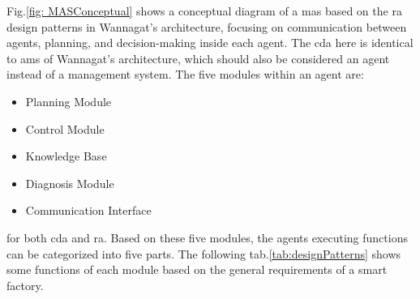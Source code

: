 
Fig.\ref{fig: MASConceptual} shows a conceptual diagram of a \gls{mas} based 
on the \gls{ra} design patterns 
in Wannagat’s architecture\cite{cruz_salazar_cyber-physical_2019}, 
focusing on communication between agents, 
planning, and decision-making inside each agent. The \gls{cda} here is identical 
to \gls{ams} of Wannagat’s architecture, which should also be considered an agent 
instead of a management system. The five modules within an agent are:

\begin{itemize}
    \item Planning Module
    \item Control Module
    \item Knowledge Base
    \item Diagnosis Module
    \item Communication Interface
\end{itemize}

for both \gls{cda} and \gls{ra}.
Based on these five modules, the agents executing functions can be categorized into five parts. 
The following tab.\ref{tab:designPatterns} shows 
some functions of each module based on the general requirements of a smart factory.


